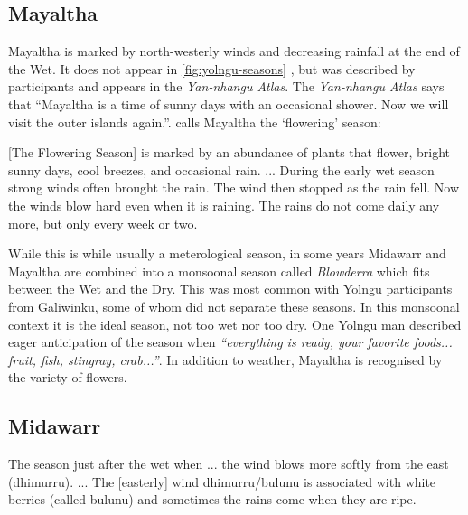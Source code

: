 \subsection{Mayaltha}

Mayaltha is marked by north-westerly winds and decreasing rainfall at the
end of the Wet.  It does not appear in \cref{fig:yolngu-seasons} \citep{davis1989},
but was described by participants and appears in the \textit{Yan-nhangu Atlas}.
%
The \textit{Yan-nhangu Atlas} says that ``Mayaltha is a time of sunny days
with an occasional shower.  Now we will visit the outer islands again.''.
\citet{davis1989} calls Mayaltha the `flowering' season:
\begin{bquote}{\citet{davis1989}}
    [The Flowering Season] is marked by an abundance of plants that
    flower, bright sunny days, cool breezes, and occasional rain. ...
    During the early wet season strong winds often brought the rain.
    The wind then stopped as the rain fell.  Now the winds blow hard
    even when it is raining.  The rains do not come daily any more,
    but only every week or two.
\end{bquote}

While this is while usually a meterological season, in some years Midawarr
and Mayaltha are combined into a monsoonal season called \textit{Blowderra}
which fits between the Wet and the Dry.  This was most common with Yolngu
participants from Galiwinku, some of whom did not separate these seasons.
%
In this monsoonal context it is the ideal season, not too wet nor too dry.
One Yolngu man described eager anticipation of the season
when \textsl{``everything is ready, your favorite foods...  fruit, fish, stingray,
crab...''}.  In addition to weather, Mayaltha is recognised by the variety
of flowers.


\subsection{Midawarr}

\begin{bquote}{\citet{barber2005}}
The season just after the wet when ... the wind blows more softly from the east
(dhimurru). ... The [easterly] wind dhimurru/bulunu is associated with white berries
(called bulunu) and sometimes the rains come when they are ripe.
\end{bquote}

